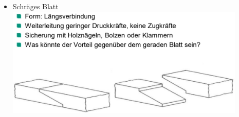 \documentclass[fleqn,twoside]{article}
\begin{document}
\begin{minipage}{0.45\textwidth}
\begin{itemize}
                    \item Schräges Blatt\\
                        \includegraphics[width=0.9\textwidth]{Grafiken/Zimmermansmaessige Verbindungen/Verbindungsarten/Schraeges Blatt.jpg}\\
        \end{itemize}
    \end{minipage}
\end{document}

